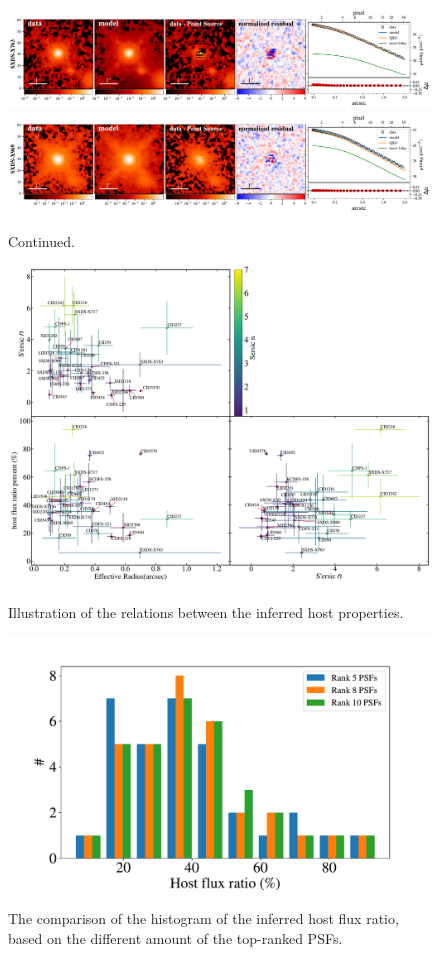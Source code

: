 \documentclass[apj]{emulateapj}
\begin{document}
\begin{figure}
\centering
{
\includegraphics[height=0.25\textwidth]{fig/best_fit_SXDS-X763_SB_profile.pdf}
\includegraphics[height=0.25\textwidth]{fig/best_fit_SXDS-X969_SB_profile.pdf}
}
\caption{Continued.}
\end{figure} 

\begin{figure}
\centering
{
\includegraphics[height=0.75\textwidth]{fig/flux_r_n_corner.pdf}
}
\caption{\label{fig:flux_r_n_corner}
Illustration of the relations between the inferred host properties.}
\end{figure} 

\begin{figure}
\centering
{
\includegraphics[height=0.35\textwidth]{fig/hist_compare.pdf}
}
\caption{\label{fig:hist_compare} 
The comparison of the histogram of the inferred host flux ratio, based on the different amount of the top-ranked PSFs.}
\end{figure} 

\end{document}
